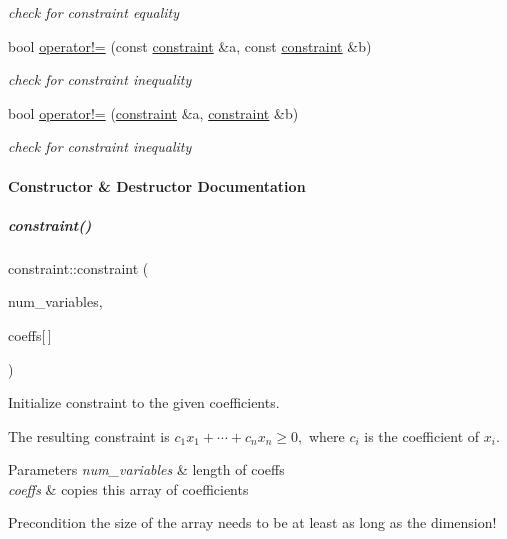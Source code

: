 \begin{DoxyCompactItemize}
\begin{DoxyCompactList}\small\item\em check for constraint equality \end{DoxyCompactList}\item 
bool \hyperlink{group___c_l_s_solvers_a6b57d19474acdea10ab0a0e954ef3ef9}{operator!=} (const \hyperlink{group___c_l_s_solvers_classconstraint}{constraint} \&a, const \hyperlink{group___c_l_s_solvers_classconstraint}{constraint} \&b)
\begin{DoxyCompactList}\small\item\em check for constraint inequality \end{DoxyCompactList}\item 
bool \hyperlink{group___c_l_s_solvers_a75ee7037f652ba94155890c109b88ef8}{operator!=} (\hyperlink{group___c_l_s_solvers_classconstraint}{constraint} \&a, \hyperlink{group___c_l_s_solvers_classconstraint}{constraint} \&b)
\begin{DoxyCompactList}\small\item\em check for constraint inequality \end{DoxyCompactList}\end{DoxyCompactItemize}


\paragraph{Constructor \& Destructor Documentation}
\mbox{\label{group___c_l_s_solvers_aac499533508fc7e6fcdfad614dbecc48}} 
\subparagraph{\texorpdfstring{constraint()}{constraint()}\hspace{0.1cm}{\footnotesize\ttfamily [1/2]}}
{\footnotesize\ttfamily constraint\+::constraint (\begin{DoxyParamCaption}\item[{N\+V\+A\+R\+\_\+\+T\+Y\+PE}]{num\+\_\+variables,  }\item[{C\+O\+N\+S\+T\+R\+\_\+\+T\+Y\+PE}]{coeffs\mbox{[}$\,$\mbox{]} }\end{DoxyParamCaption})}



Initialize constraint to the given coefficients. 

The resulting constraint is $ c_1x_1 + \cdots + c_nx_n \geq 0, $ where $ c_i $ is the coefficient of $ x_i $. 
\begin{DoxyParams}{Parameters}
{\em num\+\_\+variables} & length of coeffs \\
\hline
{\em coeffs} & copies this array of coefficients \\
\hline
\end{DoxyParams}
\begin{DoxyPrecond}{Precondition}
the size of the array needs to be at least as long as the dimension! 
\end{DoxyPrecond}


